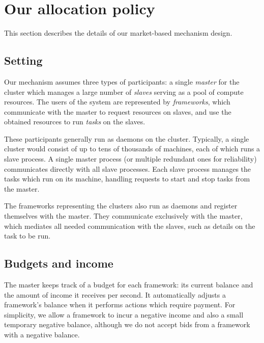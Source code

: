 \documentclass{acm_proc_article-sp}
\begin{document}

\section{Our allocation policy}

This section describes the details of our market-based mechanism design.

\label{sec:design}
\subsection{Setting}
Our mechanism assumes three types of participants: a single \emph{master} for
the cluster which manages a large number of \emph{slaves} serving as a pool of
compute resources. The users of the system are represented by \emph{frameworks},
which communicate with the master to request resources on slaves, and use the
obtained resources to run \emph{tasks} on the slaves.

These participants generally run as daemons on the cluster.  Typically, a single
cluster would consist of up to tens of thousands of machines, each of which
runs a slave process. A single master process (or multiple redundant ones
for reliability) communicates directly with all slave processes.  Each slave
process manages the tasks which run on its machine, handling requests to start
and stop tasks from the master.

The frameworks representing the clusters also run as daemons and register
themselves with the master. They communicate exclusively with the master, which
mediates all needed communication with the slaves, such as details on the task
to be run.

\subsection{Budgets and income}
The master keeps track of a budget for each framework: its current balance and
the amount of income it receives per second. It automatically adjusts a
framework's balance when it performs actions which require payment. For simplicity,
we allow a framework to incur a negative income and also a small temporary negative balance, although we do not accept bids from a framework with a negative balance.
\end{document}
